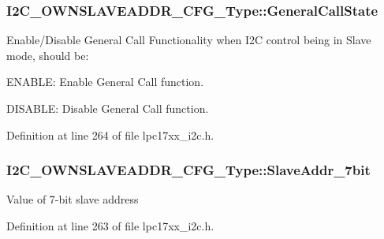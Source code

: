 \subsubsection[{\texorpdfstring{General\+Call\+State}{GeneralCallState}}]{ I2\+C\+\_\+\+O\+W\+N\+S\+L\+A\+V\+E\+A\+D\+D\+R\+\_\+\+C\+F\+G\+\_\+\+Type\+::\+General\+Call\+State}\hypertarget{struct_i2_c___o_w_n_s_l_a_v_e_a_d_d_r___c_f_g___type_a7854696cf45e880ce3602d3c020fcdb5}{}\label{struct_i2_c___o_w_n_s_l_a_v_e_a_d_d_r___c_f_g___type_a7854696cf45e880ce3602d3c020fcdb5}
Enable/\+Disable General Call Functionality when I2C control being in Slave mode, should be\+:
\begin{DoxyItemize}
\item E\+N\+A\+B\+LE\+: Enable General Call function.
\item D\+I\+S\+A\+B\+LE\+: Disable General Call function. 
\end{DoxyItemize}

Definition at line 264 of file lpc17xx\+\_\+i2c.\+h.

\subsubsection[{\texorpdfstring{Slave\+Addr\+\_\+7bit}{SlaveAddr_7bit}}]{ I2\+C\+\_\+\+O\+W\+N\+S\+L\+A\+V\+E\+A\+D\+D\+R\+\_\+\+C\+F\+G\+\_\+\+Type\+::\+Slave\+Addr\+\_\+7bit}\hypertarget{struct_i2_c___o_w_n_s_l_a_v_e_a_d_d_r___c_f_g___type_a68d407a41be44644ce3ee911f59bc870}{}\label{struct_i2_c___o_w_n_s_l_a_v_e_a_d_d_r___c_f_g___type_a68d407a41be44644ce3ee911f59bc870}
Value of 7-\/bit slave address 

Definition at line 263 of file lpc17xx\+\_\+i2c.\+h.


